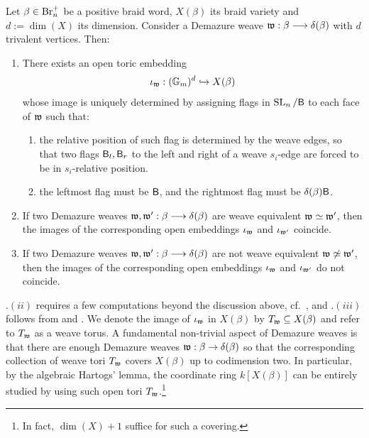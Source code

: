 \begin{fcor}\label{cor:weave_to_toric_embedding}
Let $\beta\in\text{Br}_n^+$ be a positive braid word, $X(\beta)$ its braid variety and $d:=\dim(X)$ its dimension. Consider a Demazure weave $\mathfrak{w}:\beta\longrightarrow\delta(\beta)$ with $d$ trivalent vertices. Then:
\begin{enumerate}[label=$(\roman*)$]
    \item There exists an open toric embedding
\begin{equation}\label{eq:weave_tori_map}
\iota_{\mathfrak{w}}:(\mathbb{G}_m)^d\hookrightarrow X(\beta)
\end{equation}
whose image is uniquely determined by assigning flags in $\operatorname{SL}_n/\mathsf{B}$ to each face of $\mathfrak{w}$ such that:\\
\begin{enumerate}[label=$(\alph*)$]
    \item the relative position of such flag is determined by the weave edges, so that two flags $\mathsf{B}_l,\mathsf{B}_r$ to the left and right of a weave $s_i$-edge are forced to be in $s_i$-relative position.\\
    \item the leftmost flag must be $\mathsf{B}$, and the rightmost flag must be $\delta(\beta)\mathsf{B}$.\\
\end{enumerate}

\item If two Demazure weaves $\mathfrak{w},\mathfrak{w}':\beta\longrightarrow\delta(\beta)$ are weave equivalent $\mathfrak{w}\simeq\mathfrak{w}'$, then the images of the corresponding open embeddings $\iota_{\mathfrak{w}}$ and $\iota_{\mathfrak{w}'}$ coincide.\\
\item If two Demazure weaves $\mathfrak{w},\mathfrak{w}':\beta\longrightarrow\delta(\beta)$ are not weave equivalent $\mathfrak{w}\not\simeq\mathfrak{w}'$, then the images of the corresponding open embeddings $\iota_{\mathfrak{w}}$ and $\iota_{\mathfrak{w}'}$ do not coincide.\sbs
\end{enumerate}
\end{fcor}
\vspace{0.2cm}
\noindent {}.$(ii)$ requires a few computations beyond the discussion above, cf.~\cite[Section 5.3]{CGGLSS25}, and .$(iii)$ follows from \cite[Theorem 1.1]{CGGLSS25} and \cite[Prop.~ 5.3]{CaoKellerQin22}. We denote the image of $\iota_{\mathfrak{w}}$ in $X(\beta)$ by $T_{\mathfrak{w}}\subseteq X(\beta)$ and refer to $T_{\mathfrak{w}}$ as a weave torus. A fundamental non-trivial aspect of Demazure weaves is that \color{blue}there are enough Demazure weaves $\mathfrak{w}:\beta\to\delta(\beta)$ so that the corresponding collection of weave tori $T_{\mathfrak{w}}$ covers $X(\beta)$ up to codimension two\color{black}. In particular, by the algebraic Hartogs' lemma, the coordinate ring $k[X(\beta)]$ can be entirely studied by using such open tori $T_{\mathfrak{w}}$.\footnote{In fact, $\dim(X)+1$ suffice for such a covering.}

